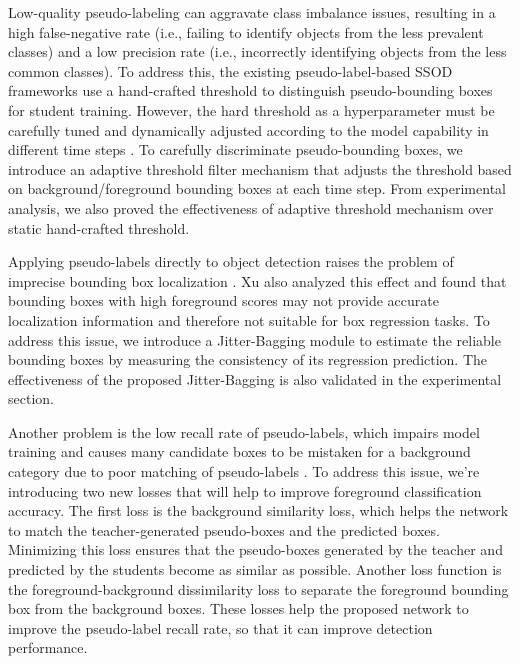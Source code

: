 \documentclass[10pt,twocolumn,letterpaper]{article}
\begin{document}
Low-quality pseudo-labeling can aggravate class imbalance issues, resulting in a high false-negative rate (i.e., failing to identify objects from the less prevalent classes) and a low precision rate (i.e., incorrectly identifying objects from the less common classes). To address this, the existing pseudo-label-based SSOD frameworks \cite{tang2021humble, zhou2021instant, xu2021end} use a hand-crafted threshold to distinguish pseudo-bounding boxes for student training. However, the hard threshold as a hyperparameter must be carefully tuned and dynamically adjusted according to the model capability in different time steps \cite{consistent-teaching}. To carefully discriminate pseudo-bounding boxes, we introduce an adaptive threshold filter mechanism that adjusts the threshold based on background/foreground bounding boxes at each time step. From experimental analysis, we also proved the effectiveness of adaptive threshold mechanism over static hand-crafted threshold.


Applying pseudo-labels directly to object detection raises the problem of imprecise bounding box localization \cite{DCST}. Xu \etal \cite{xu2021end} also analyzed this effect and found 
that bounding boxes with high foreground scores may not provide accurate localization information and therefore not suitable for box regression tasks. To address this issue, we introduce a Jitter-Bagging module to estimate the reliable bounding boxes by measuring the consistency of its regression prediction. 
The effectiveness of the proposed Jitter-Bagging is also validated in the experimental section.


Another problem is the low recall rate of pseudo-labels, which impairs model training and causes many candidate boxes to be mistaken for a background category due to poor matching of pseudo-labels \cite{DCST}. To address this issue, we're introducing two new losses that will help to improve foreground classification accuracy. The first loss is the background similarity loss, which helps the network to match the teacher-generated pseudo-boxes and the predicted boxes. Minimizing this loss ensures that the pseudo-boxes generated by the teacher and predicted by the students become as similar as possible. Another loss function is the foreground-background dissimilarity loss to separate the foreground bounding box from the background boxes. These losses help the proposed network to improve the pseudo-label recall rate, so that it can improve detection performance. 
\end{document}
